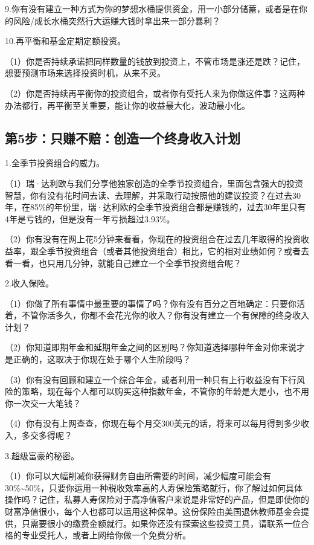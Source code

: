 9.你有没有建立一种方式为你的梦想水桶提供资金，用一小部分储蓄，或者是在你的风险/成长水桶突然行大运赚大钱时拿出来一部分暴利？

10.再平衡和基金定期定额投资。

（1）你是否持续承诺把同样数量的钱放到投资上，不管市场是涨还是跌？记住，想要预测市场来选择投资时机，从来不灵。

（2）你是否持续再平衡你的投资组合，或者你有受托人来为你做这件事？这两种办法都行，再平衡至关重要，能让你的收益最大化，波动最小化。

\subsection{第5步：只赚不赔：创造一个终身收入计划}

1.全季节投资组合的威力。

（1）瑞·达利欧与我们分享他独家创造的全季节投资组合，里面包含强大的投资智慧，你有没有花时间去读、去理解，并采取行动按照他的建议投资？在过去30年，在85\%的年份里，瑞·达利欧的全季节投资组合都是赚钱的，过去30年里只有4年是亏钱的，但是没有一年亏损超过3.93\%。

（2）你有没有在网上花5分钟来看看，你现在的投资组合在过去几年取得的投资收益率，跟全季节投资组合（或者其他投资组合）相比，它的相对业绩如何？或者去看一看，也只用几分钟，就能自己建立一个全季节投资组合呢？

2.收入保险。

（1）你做了所有事情中最重要的事情了吗？你有没有百分之百地确定：只要你活着，不管你活多久，你都不会花光你的收入？你有没有建立一个有保障的终身收入计划？

（2）你知道即期年金和延期年金之间的区别吗？你知道选择哪种年金对你来说才是正确的，这取决于你现在处于哪个人生阶段吗？

（3）你有没有回顾和建立一个综合年金，或者利用一种只有上行收益没有下行风险的策略，现在每个人都可以购买这种指数年金，不管你的年龄是大是小，也不用你一次交一大笔钱？

（4）你有没有上网查查，你现在每个月交300美元的话，将来可以每月得到多少收入，多交多得呢？

3.超级富豪的秘密。

（1）你可以大幅削减你获得财务自由所需要的时间，减少幅度可能会有30\%\textasciitilde{}50\%，只要你运用一种税收效率高的人寿保险策略就行，你了解过如何具体操作吗？记住，私募人寿保险对于高净值客户来说是非常好的产品，但是即使你的财富净值很小，每个人也都可以运用这种保单。这份保险由美国退休教师基金会提供，只需要很小的缴费金额就行。如果你还没有探索这些投资工具，请联系一位合格的专业受托人，或者上网给你做一个免费分析。

